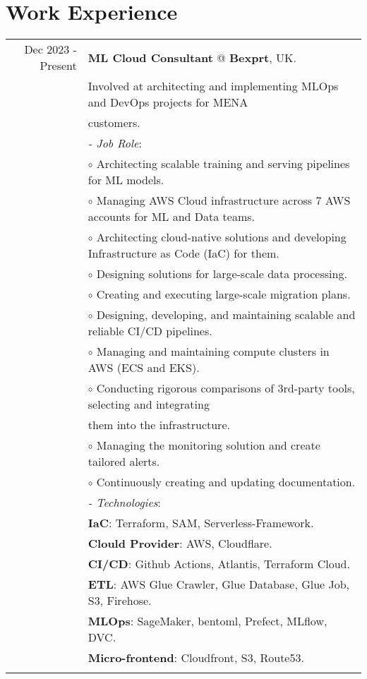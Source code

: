 \documentclass[a4paper,10pt]{article}
\begin{document}
\section{\textbf{Work Experience}}
\begin{longtable}{r|l}
    Dec 2023 - Present& \textbf{ML Cloud Consultant} @
    \textbf{Bexprt}, UK. \\&
    Involved at architecting and implementing MLOps and DevOps projects for MENA \\& customers. \\&
    \textit{- Job Role}:\\&
    $\circ$ Architecting scalable training and serving pipelines for ML models. \\ &
    $\circ$ Managing AWS Cloud infrastructure across 7 AWS accounts for ML and Data teams. \\ &
    $\circ$ Architecting cloud-native solutions and developing Infrastructure as Code (IaC) for them. \\ &
    $\circ$ Designing solutions for large-scale data processing. \\ &
    $\circ$ Creating and executing large-scale migration plans. \\ &
    $\circ$ Designing, developing, and maintaining scalable and reliable CI/CD pipelines. \\ &
    $\circ$ Managing and maintaining compute clusters in AWS (ECS and EKS). \\ &
    $\circ$ Conducting rigorous comparisons of 3rd-party tools, selecting and integrating \\ & them into the infrastructure. \\ &
    $\circ$ Managing the monitoring solution and create tailored alerts. \\ &
    $\circ$ Continuously creating and updating documentation. \\ &
    \textit{- Technologies}:\\&
    \textbf{IaC}: Terraform, SAM, Serverless-Framework. \\&
    \textbf{Clould Provider}: AWS, Cloudflare. \\&
    \textbf{CI/CD}: Github Actions, Atlantis, Terraform Cloud. \\&
    \textbf{ETL}: AWS Glue Crawler, Glue Database, Glue Job, S3, Firehose. \\&
    \textbf{MLOps}: SageMaker, bentoml, Prefect, MLflow, DVC. \\&
    \textbf{Micro-frontend}: Cloudfront, S3, Route53. \\&

\end{longtable}
\end{document}

